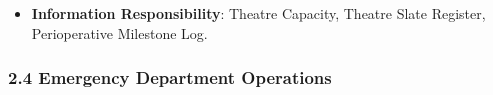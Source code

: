 \begin{itemize}
\begin{itemize}
\begin{itemize}
\item 
\emph{Governed Process}: \textbf{Theatre Case Progression Process}.



\end{itemize}


\end{itemize}


\item 
\textbf{Information Responsibility}: Theatre Capacity, Theatre Slate Register, Perioperative Milestone Log.



\end{itemize}
\label{rad:hso:118}

\par\smallskip
{}\label{rad:hso:120}
\subsubsection*{2.4 Emergency Department Operations}
\label{rad:hso:121}

